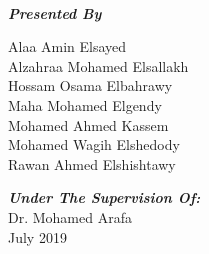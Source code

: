 \begin{titlepage}
\begin{center}
{\begin{tabularx}{\textwidth}{
  @{} p{}
  @{} p{} 
  @{} p{} @{} }
  \end{tabularx}
}



\vspace{30pt} {%
  \renewcommand*{\familydefault}{\defaultFont}
  \fontsize{39pt}{42pt}\selectfont%
  \reportTitle{}\\
  \vspace{10pt}%
  \fontsize{26pt}{31pt}\selectfont%
}

\fontsize{16pt}{19pt}\selectfont%

\vspace{20pt}

\vspace{30pt}
\textbf{\textit{Presented By}}\\


\vspace{5pt} 

    
\begin{center}
Alaa Amin Elsayed\\
Alzahraa Mohamed Elsallakh\\
Hossam Osama Elbahrawy\\
Maha Mohamed Elgendy\\
Mohamed Ahmed Kassem\\
Mohamed Wagih Elshedody\\
Rawan Ahmed Elshishtawy\\
\end{center}

\vspace{30pt}
\textbf{\textit{Under The Supervision Of:}}\\

\vspace{5pt}
Dr. Mohamed Arafa\\
\vspace{50pt}
July 2019

\vfill

\end{center}
\end{titlepage}